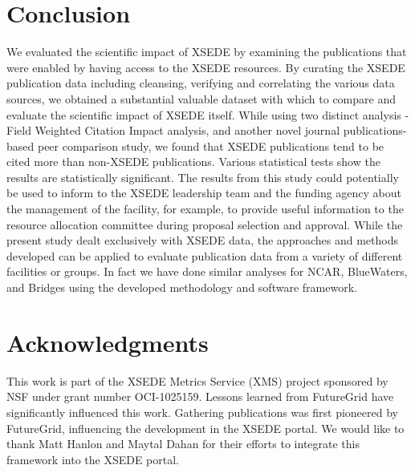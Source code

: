 \documentclass{sig-alternate}
\begin{document}
\section{Conclusion} \label{S:conclusion}

We evaluated the scientific impact of XSEDE by examining the
publications that were enabled by having access to the XSEDE
resources. By curating the XSEDE publication data including cleansing,
verifying and correlating the various data sources, we obtained a
substantial valuable dataset with which to compare and evaluate the
scientific impact of XSEDE itself.  While using two distinct analysis
- Field Weighted Citation Impact analysis, and another novel journal
publications-based peer comparison study, we found that XSEDE
publications tend to be cited more than non-XSEDE publications.
Various statistical tests show the results are statistically
significant.  The results from this study could potentially be used to
inform to the XSEDE leadership team and the funding agency about the
management of the facility, for example, to provide useful information
to the resource allocation committee during proposal selection and
approval.  While the present study dealt exclusively with XSEDE data,
the approaches and methods developed can be applied to evaluate
publication data from a variety of different facilities or groups.  In
fact we have done similar analyses for NCAR, BlueWaters, and Bridges
using the developed methodology and software framework.


\section{Acknowledgments}

This work is part of the XSEDE Metrics Service (XMS) project sponsored
by NSF under grant number OCI-1025159. Lessons learned from FutureGrid
have significantly influenced this work. Gathering publications was
first pioneered by FutureGrid, influencing the development in the XSEDE
portal. We would like to thank Matt Hanlon and Maytal Dahan for their
efforts to integrate this framework into the XSEDE portal.


 
 
\end{document}
